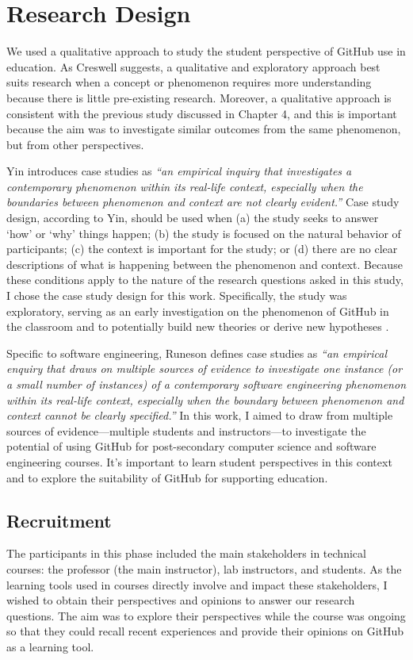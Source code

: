 \section{Research Design}
We used a qualitative approach to study the student perspective of GitHub use in education. As Creswell \cite{creswell2013research} suggests, a qualitative and exploratory approach best suits research when a concept or phenomenon requires more understanding because there is little pre-existing research. Moreover, a qualitative approach is consistent with the previous study discussed in Chapter 4, and this is important because the aim was to investigate similar outcomes from the same phenomenon, but from other perspectives. %

Yin \cite{yin2013case} introduces case studies as \textit{``an empirical inquiry that investigates a contemporary phenomenon within its real-life context, especially when the boundaries between phenomenon and context are not clearly evident.''} Case study design, according to Yin, should be used when (a) the study seeks to answer `how' or `why' things happen; (b) the study is focused on the natural behavior of participants; (c) the context is important for the study; or (d) there are no clear descriptions of what is happening between the phenomenon and context. Because these conditions apply to the nature of the research questions asked in this study, I chose the case study design for this work. Specifically, the study was exploratory, serving as an early investigation on the phenomenon of GitHub in the classroom and to potentially build new theories or derive new hypotheses \cite{easterbrook2008selecting}.

Specific to software engineering, Runeson \cite{runeson2012case} defines case studies as \textit{``an empirical enquiry that draws on multiple sources of evidence to investigate one instance (or a small number of instances) of a contemporary software engineering phenomenon within its real-life context, especially when the boundary between phenomenon and context cannot be clearly specified.''} In this work, I aimed to draw from multiple sources of evidence---multiple students and instructors---to investigate the potential of using GitHub for post-secondary computer science and software engineering courses. It's important to learn student perspectives in this context and to explore the suitability of GitHub for supporting education.

\subsection{Recruitment}
The participants in this phase included the main stakeholders in technical courses: the professor (the main instructor), lab instructors, and students. As the learning tools used in courses directly involve and impact these stakeholders, I wished to obtain their perspectives and opinions to answer our research questions. The aim was to explore their perspectives while the course was ongoing so that they could recall recent experiences and provide their opinions on GitHub as a learning tool.

